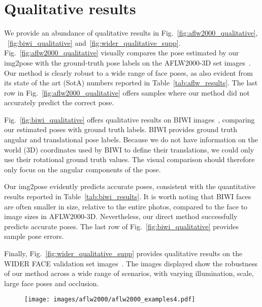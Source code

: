 \documentclass[final]{cvpr}
\begin{document}
\section{Qualitative results}\label{sec:append:qual}
We provide an abundance of qualitative results in Fig.~\ref{fig:aflw2000_qualitative}, ~\ref{fig:biwi_qualitative} and~\ref{fig:wider_qualitative_supp}.
Fig.~\ref{fig:aflw2000_qualitative} visually compares the pose estimated by our img2pose with the ground-truth pose labels on the AFLW2000-3D set images~\cite{3ddfa}. Our method is clearly robust to a wide range of face poses, as also evident from its state of the art (SotA) numbers reported in Table~\ref{tab:aflw_results}. The last row in Fig.~\ref{fig:aflw2000_qualitative} offers samples where our method did not accurately predict the correct pose. 

Fig.~\ref{fig:biwi_qualitative} offers qualitative results on BIWI images~\cite{biwi}, comparing our estimated poses with ground truth labels. BIWI provides ground truth angular and translational pose labels. Because we do not have information on the world (3D) coordinates used by BIWI to define their translations, we could only use their rotational ground truth values. The visual comparison should therefore only focus on the angular components of the pose. 

Our img2pose evidently predicts accurate poses, consistent with the quantitative results reported in Table~\ref{tab:biwi_results}. It is worth noting that BIWI faces are often smaller in size, relative to the entire photos, compared to the face to image sizes in AFLW2000-3D. Nevertheless, our direct method successfully predicts accurate poses. The last row of Fig.~\ref{fig:biwi_qualitative} provides sample pose errors. 

Finally, Fig.~\ref{fig:wider_qualitative_supp} provides qualitative results on the WIDER FACE validation set images~\cite{wider_face}. The images displayed show the robustness of our method across a wide range of scenarios, with varying illumination, scale, large face poses and occlusion.

\begin{figure*}[!ht]
    \centering
    \begin{subfigure}[b]{1\textwidth}
        \centering
        \texttt{[image: images/aflw2000/aflw2000\_examples4.pdf]}
    \end{subfigure}
    \caption{Qualitative comparing the results of our img2pose method on images from the AFLW2000-3D set to the ground truth poses. Poses visualized using a 3D face shape rendered using the pose on input photos. We provide results reflecting a wide range of face poses and viewing settings. The bottom row provides sample qualitative errors.}
    \label{fig:aflw2000_qualitative}
\end{figure*}
\end{document}
